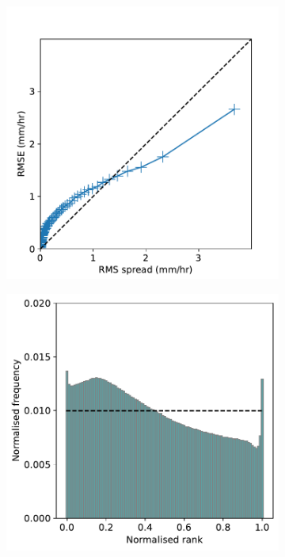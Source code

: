 \documentclass{article}
\begin{document}
\begin{figure}
    \centering
    \begin{subfigure}[t]{0.49\textwidth}
     \includegraphics[width=\textwidth]{images/spread_error_final-nologs_217600.pdf}
     \caption{}
     \end{subfigure}
     \centering
    \begin{subfigure}[t]{0.49\textwidth}
     \includegraphics[width=\textwidth]{images/rank_hist_final-nologs_217600.pdf}

\end{subfigure}
\end{figure}
\end{document}
